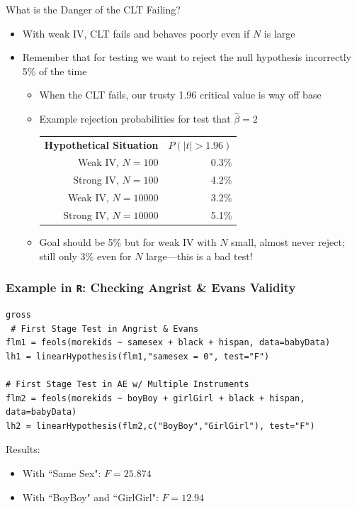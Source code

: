 \documentclass[aspectratio=169,11pt]{beamer}
\begin{document}
\begin{frame}{What is the Danger of the CLT Failing?}

	\begin{itemize}
		\item With weak IV, CLT fails and behaves poorly even if $N$ is large
		\item Remember that for testing we want to reject the null hypothesis incorrectly 5\% of the time
			\begin{itemize}
				\item When the CLT fails, our trusty 1.96 critical value is way off base
				\item Example rejection probabilities for test that $\hat\beta=2$
				\begin{table}[H]
				\centering
				\begin{tabular}{rr}
						{\bf Hypothetical Situation} & $P(|t|>1.96)$ \\
						Weak IV, $N=100$ &  0.3\% \\
						Strong IV, $N=100$ & 4.2\% \\
						Weak IV, $N=10000$ & 3.2\% \\
						Strong IV, $N=10000$ & 5.1\% \\
				\end{tabular}
				\end{table}
				\item Goal should be 5\% but for weak IV with $N$ small, almost never reject; still only 3\% even for $N$ large---this is a bad test!

			\end{itemize}
	\end{itemize}
\end{frame}



\begin{frame}[fragile]\frametitle{Example in \texttt{R}: Checking Angrist \& Evans Validity}
\begin{lstlisting}[frame=single]  % Start your code-block
		gross
 # First Stage Test in Angrist & Evans
flm1 = feols(morekids ~ samesex + black + hispan, data=babyData)
lh1 = linearHypothesis(flm1,"samesex = 0", test="F")

# First Stage Test in AE w/ Multiple Instruments
flm2 = feols(morekids ~ boyBoy + girlGirl + black + hispan, data=babyData)
lh2 = linearHypothesis(flm2,c("BoyBoy","GirlGirl"), test="F")
\end{lstlisting}

\vspace{3mm}
	Results:
\begin{itemize}
	\item With ``Same Sex": $F = 25.874$
	\item With ``BoyBoy" and ``GirlGirl": $F = 12.94$
\end{itemize}
\end{frame}
\end{document}
